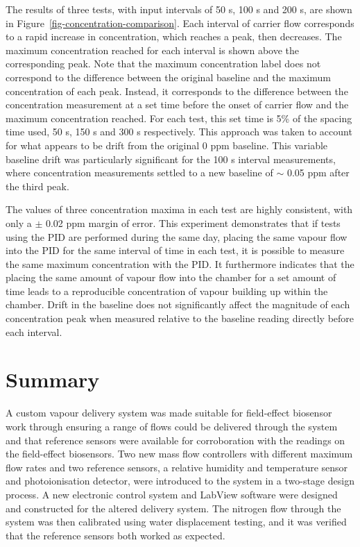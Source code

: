 \documentclass[
  a4paper,
]{scrbook}
\begin{document}
The results of three tests, with input intervals of 50 s, 100 s and 200
s, are shown in Figure~\ref{fig-concentration-comparison}. Each interval
of carrier flow corresponds to a rapid increase in concentration, which
reaches a peak, then decreases. The maximum concentration reached for
each interval is shown above the corresponding peak. Note that the
maximum concentration label does not correspond to the difference
between the original baseline and the maximum concentration of each
peak. Instead, it corresponds to the difference between the
concentration measurement at a set time before the onset of carrier flow
and the maximum concentration reached. For each test, this set time is
5\% of the spacing time used, 50 s, 150 s and 300 s respectively. This
approach was taken to account for what appears to be drift from the
original 0 ppm baseline. This variable baseline drift was particularly
significant for the 100 s interval measurements, where concentration
measurements settled to a new baseline of \(\sim\) 0.05 ppm after the
third peak.

The values of three concentration maxima in each test are highly
consistent, with only a \(\pm\) 0.02 ppm margin of error. This
experiment demonstrates that if tests using the PID are performed during
the same day, placing the same vapour flow into the PID for the same
interval of time in each test, it is possible to measure the same
maximum concentration with the PID. It furthermore indicates that the
placing the same amount of vapour flow into the chamber for a set amount
of time leads to a reproducible concentration of vapour building up
within the chamber. Drift in the baseline does not significantly affect
the magnitude of each concentration peak when measured relative to the
baseline reading directly before each interval.

\hypertarget{summary}{%
\section{Summary}\label{summary}}

A custom vapour delivery system was made suitable for field-effect
biosensor work through ensuring a range of flows could be delivered
through the system and that reference sensors were available for
corroboration with the readings on the field-effect biosensors. Two new
mass flow controllers with different maximum flow rates and two
reference sensors, a relative humidity and temperature sensor and
photoionisation detector, were introduced to the system in a two-stage
design process. A new electronic control system and LabView software
were designed and constructed for the altered delivery system. The
nitrogen flow through the system was then calibrated using water
displacement testing, and it was verified that the reference sensors
both worked as expected.
\end{document}
